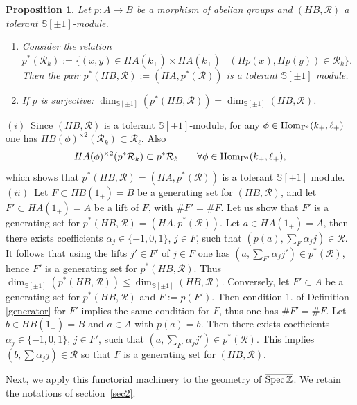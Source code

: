 \documentclass[cupthm]{CUP-JNL-JMJ}
\numberwithin{equation}{section}
\theoremstyle{cupplain}
\newtheorem{proposition}[theorem]{Proposition}
\theoremstyle{cupdefinition}
\theoremstyle{cupremark}
\theoremstyle{cupproof}
\def\S{{\mathbb S}}
\def\Z{{\mathbb Z}}
\def\cR{{\mathcal R}}
\def\Spec{{\rm Spec\,}}
\def\sss{{\S}}
\def\spm{{\sss[\pm 1]}}
\def\Hom {{\rm{Hom}}}
\def\gop{{\Gamma^{o}}}
\def\spzb{{\overline{\Spec\Z}}}
\begin{document}
\begin{appendix}
 \begin{proposition}\label{pullback} Let $p:A\to B$ be a  morphism of abelian groups and $(HB,\cR)$ a tolerant $\spm$-module.
 \begin{enumerate}
\item[(i)] Consider the relation  $p^*(\cR_k):=\{(x,y)\in HA(k_+)\times HA(k_+)\mid (Hp(x),Hp(y))\in \cR_k\}$. Then the pair $p^*(HB,\cR):=(HA,p^*(\cR))$ is a tolerant $\spm$ module.
\item[(ii)] If $p$ is surjective: $\dim_{\spm}(p^*(HB,\cR))=\dim_{\spm}(HB,\cR)$.
\end{enumerate}
 \end{proposition}
 \proof $(i)$~Since $(HB,\cR)$ is a tolerant $\spm$-module, for any $\phi\in \Hom_\gop(k_+,\ell_+)$ one has $HB(\phi)^{\times 2}(\cR_k)\subset \cR_\ell$.  Also  
 \[
 HA(\phi)^{\times 2}(p^*\cR_k)\subset p^*\cR_\ell \qquad\forall \phi\in \Hom_\gop(k_+,\ell_+),
 \]
 which shows that $p^*(HB,\cR)=(HA,p^*(\cR))$ is a tolerant $\spm$ module. \newline 
 $(ii)$~Let $F\subset HB(1_+)=B$ be a generating set for $(HB,\cR)$, and let $F'\subset HA(1_+)=A$ be a lift of $F$, with $\# F'=\# F$. Let us show that $F'$ is a generating set for $p^*(HB,\cR)=(HA,p^*(\cR))$. Let $a\in HA(1_+)=A$, then there exists coefficients $\alpha_j\in \{-1,0,1\}$,  $j\in F$, such that  $(p(a),\sum_F \alpha_j j)\in \cR$. It follows that using the lifts $j'\in F'$ of $j\in F$ one has $(a,\sum_{F'} \alpha_j j')\in p^*(\cR)$, hence $F'$ is a generating set for $p^*(HB,\cR)$. Thus $\dim_{\spm}(p^*(HB,\cR))\leq \dim_{\spm}(HB,\cR)$. Conversely, let $F'\subset A$ be a generating set for $p^*(HB,\cR)$ and $F:=p(F')$. Then condition 1. of Definition \ref{generator} for $F'$ implies the same condition for $F$, thus one has $\# F'=\# F$. Let  $b\in HB(1_+)=B$ and $a\in A$ with $p(a)=b$. Then there exists coefficients $\alpha_j\in \{-1,0,1\}$,  $j\in F'$, such that  $(a,\sum_{F'} \alpha_j j')\in p^*(\cR)$. This implies
 $(b,\sum \alpha_j j)\in \cR$ so that $F$ is a generating set for $(HB,\cR)$. \endproof  
 
 Next, we apply this functorial machinery to the geometry of $\spzb$. We retain the notations of section~\ref{sec2}.
 

\end{appendix}
\end{document}
